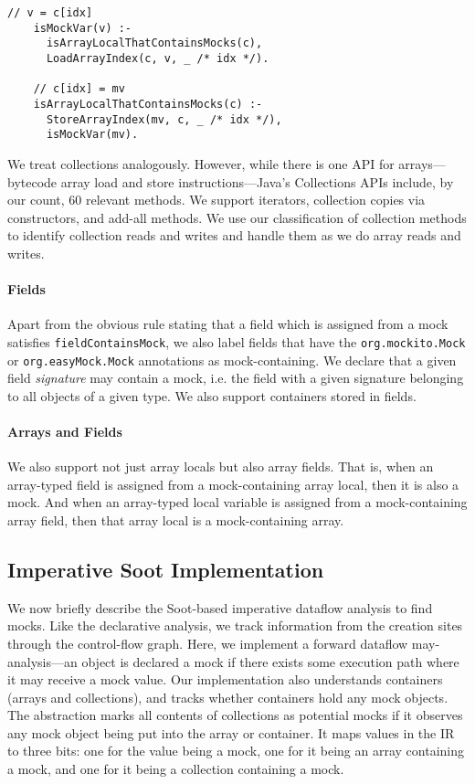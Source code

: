 \begin{lstlisting}[basicstyle=\ttfamily\small,numbers=none]
    // v = c[idx]
    isMockVar(v) :-
      isArrayLocalThatContainsMocks(c),
      LoadArrayIndex(c, v, _ /* idx */).

    // c[idx] = mv
    isArrayLocalThatContainsMocks(c) :-
      StoreArrayIndex(mv, c, _ /* idx */),
      isMockVar(mv).
\end{lstlisting}

We treat collections analogously. However, while there is one API for arrays---bytecode array load and store instructions---Java's Collections APIs include, by our count, 60 relevant methods. We support iterators, collection copies via constructors, and add-all methods. We use our classification of collection methods to identify collection reads and writes and handle them as we do array reads and writes.%

\paragraph{Fields} Apart from the obvious rule stating that a field which is assigned from a mock satisfies {\tt fieldContainsMock}, we also label fields that have the {\tt org.mockito.Mock} or {\tt org.easyMock.Mock} annotations as mock-containing. We declare that a given field \emph{signature} may contain a mock, i.e. the field with a given signature belonging to all objects of a given type. We also support containers stored in fields.

\paragraph{Arrays and Fields} We also support not just array locals but also array fields. That is, when an array-typed field is assigned from a mock-containing array local, then it is also a mock. And when an array-typed local variable is assigned from a mock-containing array field, then that array local is a mock-containing array.

\subsection{Imperative Soot Implementation}
\label{subsec:soot}
We now briefly describe the Soot-based imperative dataflow analysis to find mocks. Like the declarative analysis, we track information from the creation sites through the control-flow graph. Here, we implement a forward dataflow may-analysis---an object is declared a mock if there exists some execution path where it may receive a mock value. Our implementation also understands containers (arrays and collections), and tracks whether containers hold any mock objects. The abstraction marks all contents of collections as potential mocks if it observes any mock object being put into the array or container. It maps values in the IR to three bits: one for the value being a mock, one for it being an array containing a mock, and one for it being a collection containing a mock. %

